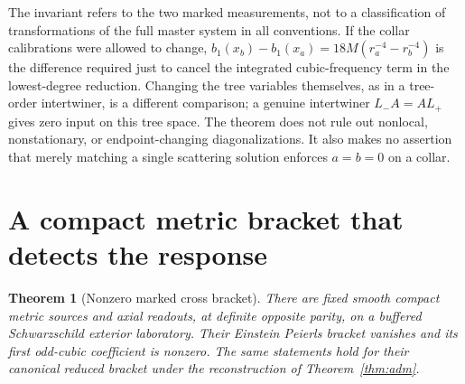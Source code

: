 \documentclass[11pt]{article}
\newtheorem{theorem}{Theorem}
\begin{document}
The invariant refers to the two marked measurements, not to a classification of transformations of the full master system in all conventions. If the collar calibrations were allowed to change, \(b_1(x_b)-b_1(x_a)=18M(r_a^{-4}-r_b^{-4})\) is the difference required just to cancel the integrated cubic-frequency term in the lowest-degree reduction. Changing the tree variables themselves, as in a tree-order intertwiner, is a different comparison; a genuine intertwiner \(L_-A=AL_+\) gives zero input on this tree space. The theorem does not rule out nonlocal, nonstationary, or endpoint-changing diagonalizations. It also makes no assertion that merely matching a single scattering solution enforces \(a=b=0\) on a collar.

\section{A compact metric bracket that detects the response}

\begin{theorem}[Nonzero marked cross bracket]
There are fixed smooth compact metric sources and axial readouts, at definite opposite parity, on a buffered Schwarzschild exterior laboratory. Their Einstein Peierls bracket vanishes and its first odd-cubic coefficient is nonzero. The same statements hold for their canonical reduced bracket under the reconstruction of Theorem~\ref{thm:adm}.
\end{theorem}
\end{document}
